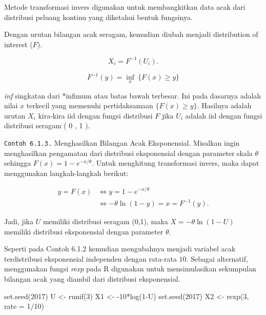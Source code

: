 \documentclass[
]{book}
\newenvironment{Shaded}{\begin{snugshade}}{\end{snugshade}}
\newcommand{\AttributeTok}[1]{\textcolor[rgb]{0.77,0.63,0.00}{#1}}
\newcommand{\DecValTok}[1]{\textcolor[rgb]{0.00,0.00,0.81}{#1}}
\newcommand{\FunctionTok}[1]{\textcolor[rgb]{0.00,0.00,0.00}{#1}}
\newcommand{\NormalTok}[1]{#1}
\newcommand{\OtherTok}[1]{\textcolor[rgb]{0.56,0.35,0.01}{#1}}
\newcommand{\SpecialCharTok}[1]{\textcolor[rgb]{0.00,0.00,0.00}{#1}}
\begin{document}
Metode transformasi invers digunakan untuk membangkitkan data acak dari distribusi peluang kontinu yang diketahui bentuk fungsinya.

Dengan urutan bilangan acak seragam, kemudian diubah menjadi distribution of interest (\(F\)).

\[X_i=F^{-1}\left( U_i \right) .\]

\[F^{-1}(y) = \inf_x ~ \{ F(x) \ge y \}\]

\emph{inf} singkatan dari *infimum atau batas bawah terbesar. Ini pada dasarnya adalah nilai \(x\) terkecil yang memenuhi pertidaksamaan \(\{F(x) \ge y\}\). Hasilnya adalah urutan \(X_{i}\) kira-kira iid dengan fungsi distribusi \(F\) jika \(U_{i}\) adalah iid dengan fungsi distribusi seragam ( 0 , 1 ).

\texttt{Contoh\ 6.1.3.} Menghasilkan Bilangan Acak Eksponensial. Misalkan ingin menghasilkan pengamatan dari distribusi eksponensial dengan parameter skala \(θ\) sehingga \(F(x) = 1 - e^{-x/\theta}\). Untuk menghitung transformasi invers, maka dapat menggunakan langkah-langkah berikut:

\[\begin{aligned}
 y = F(x) &\Leftrightarrow  y = 1-e^{-x/\theta} \\
  &\Leftrightarrow -\theta \ln(1-y) = x = F^{-1}(y) .
\end{aligned}\]

Jadi, jika \(U\) memiliki distribusi seragam (0,1), maka \(X = -\theta \ln(1-U)\) memiliki distribusi eksponensial dengan parameter \(θ\).

Seperti pada Contoh 6.1.2 kemudian mengubahnya menjadi variabel acak terdistribusi eksponensial independen dengan rata-rata \(10\). Sebagai alternatif, menggunakan fungsi \emph{rexp} pada R digunakan untuk mensimulasikan sekumpulan bilangan acak yang diambil dari distribusi eksponensial.

\begin{Shaded}
\begin{Highlighting}[]
\FunctionTok{set.seed}\NormalTok{(}\DecValTok{2017}\NormalTok{)}
\NormalTok{U }\OtherTok{\textless{}{-}} \FunctionTok{runif}\NormalTok{(}\DecValTok{3}\NormalTok{)}
\NormalTok{X1 }\OtherTok{\textless{}{-}} \SpecialCharTok{{-}}\DecValTok{10}\SpecialCharTok{*}\FunctionTok{log}\NormalTok{(}\DecValTok{1}\SpecialCharTok{{-}}\NormalTok{U)}
\FunctionTok{set.seed}\NormalTok{(}\DecValTok{2017}\NormalTok{)}
\NormalTok{X2 }\OtherTok{\textless{}{-}} \FunctionTok{rexp}\NormalTok{(}\DecValTok{3}\NormalTok{, }\AttributeTok{rate =} \DecValTok{1}\SpecialCharTok{/}\DecValTok{10}\NormalTok{)}
\end{Highlighting}
\end{Shaded}
\end{document}
